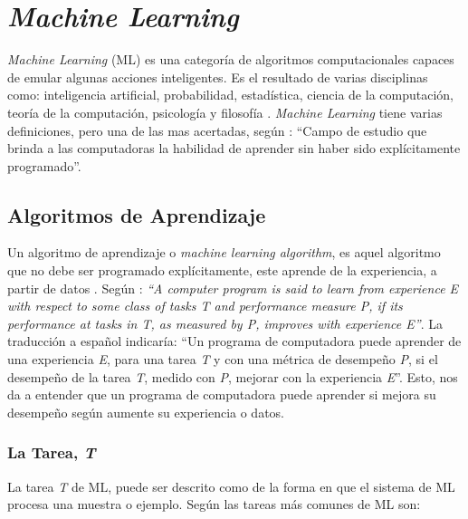 \section{\textit{Machine Learning}}

\textit{Machine Learning} (ML) es una categoría de algoritmos computacionales capaces de emular algunas acciones inteligentes. Es el resultado de varias disciplinas como: inteligencia artificial, probabilidad, estadística, ciencia de la computación, teoría de la computación, psicología y filosofía \citep{el2022machine}. \textit{Machine Learning}  tiene varias definiciones, pero una de las mas acertadas, según \cite{samuel1967some}: ``Campo de estudio que brinda a las computadoras la habilidad de aprender sin haber sido explícitamente programado''. \\





\subsection{Algoritmos de Aprendizaje}

Un algoritmo de aprendizaje o \textit{machine learning algorithm}, es aquel algoritmo que no debe ser programado explícitamente, este aprende de la experiencia, a partir de datos \citep{Goodfellow2016}.  Según \cite{mitchell1997machine}: \textit{``A computer program is said to learn from experience \textit{E} with respect to some class of tasks \textit{T} and performance measure \textit{P}, if its performance at tasks in \textit{T}, as measured by \textit{P}, improves with experience \textit{E}''}. La traducción a español indicaría: ``Un programa de computadora puede aprender de una experiencia \textit{E}, para una tarea \textit{T} y con una métrica de desempeño \textit{P}, si el desempeño de la tarea \textit{T}, medido con \textit{P}, mejorar con la experiencia \textit{E}''. Esto, nos da a entender que un programa de computadora puede aprender si mejora su desempeño según aumente su experiencia o datos.



\subsubsection{La Tarea, \textit{T}}

La tarea \textit{T} de ML, puede ser descrito como de la forma en que el sistema de ML procesa una muestra o ejemplo. Según \cite{Goodfellow2016} las tareas más comunes de ML son:

